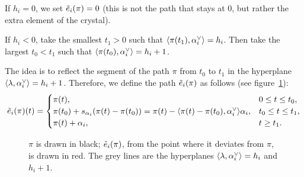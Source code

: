 If $h_i = 0$, we set $\tilde{e}_i(\pi) = 0$ (this is not the path that stays at $0$,
but rather the extra element of the crystal).

If $h_i < 0$, take the smallest $t_1 > 0$ such that
$\langle \pi(t_1),\alpha_i^{\vee}\rangle = h_i$. Then take the largest $t_0 < t_1$ such
that $\langle \pi(t_0),\alpha_i^{\vee}\rangle = h_i + 1$.

The idea is to reflect the segment of the path $\pi$ from $t_0$ to $t_1$ in
the hyperplane $\langle \lambda,\alpha_i^{\vee}\rangle = h_i + 1$. Therefore, we define the
path $\tilde{e}_i(\pi)$ as follows (see figure~\ref{fig:littelmann}):
\[
  \tilde{e}_i(\pi)(t) = \begin{cases}
    \pi(t), & 0 \leq t \leq t_0,\\
    \pi(t_0) + s_{\alpha_i}(\pi(t) - \pi(t_0))
      = \pi(t) - \langle \pi(t) - \pi(t_0),\alpha_i^{\vee}\rangle\alpha_i, & t_0 \leq t \leq t_1,\\
    \pi(t) + \alpha_i, & t \geq t_1.
  \end{cases}
\]

\begin{figure}[!htbp]
\centering
{}
\caption{$\pi$ is drawn in black; $\tilde{e}_i(\pi)$, from the point where it
deviates from $\pi$, is drawn in red. The grey lines are the hyperplanes
$\langle \lambda,\alpha_i^{\vee}\rangle = h_i$ and $h_i + 1$.}
\label{fig:littelmann}
\end{figure}

